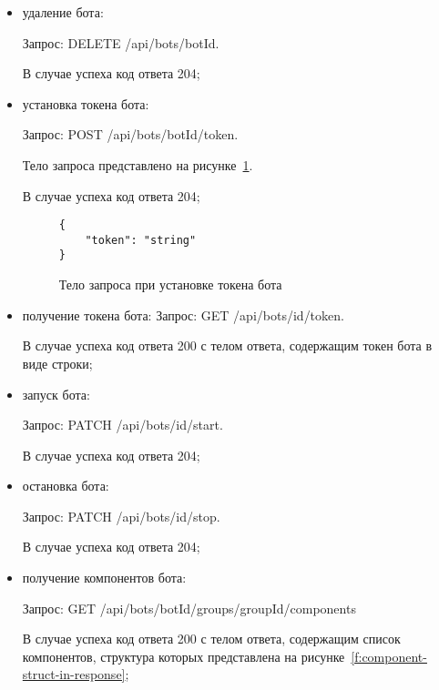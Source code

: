 \begin{itemize}
	\item удаление бота:

	      Запрос: DELETE /api/bots/{botId}.

	      В случае успеха код ответа 204;

	\item установка токена бота:

	      Запрос: POST /api/bots/{botId}/token.

	      Тело запроса представлено на рисунке~\ref{f:set-token-request-body}.

	      В случае успеха код ответа 204;


	      \begin{figure}[!ht]
		      \centering
		      \vspace{\toppaddingoffigure}
		      \begin{lstlisting}
{
    "token": "string"
}
    \end{lstlisting}
		      \caption{Тело запроса при установке токена бота}
		      \label{f:set-token-request-body}
	      \end{figure}


	\item получение токена бота:
	      Запрос: GET /api/bots/{id}/token.

	      В случае успеха код ответа 200 с телом ответа, содержащим токен бота
	      в виде строки;

	\item запуск бота:

	      Запрос: PATCH /api/bots/{id}/start.

	      В случае успеха код ответа 204;

	\item остановка бота:

	      Запрос: PATCH /api/bots/{id}/stop.

	      В случае успеха код ответа 204;

	\item получение компонентов бота:

	      Запрос: GET /api/bots/{botId}/groups/{groupId}/components

	      В случае успеха код ответа 200 с телом ответа, содержащим список
	      компонентов, структура которых представлена
	      на рисунке~\ref{f:component-struct-in-response};



\end{itemize}
